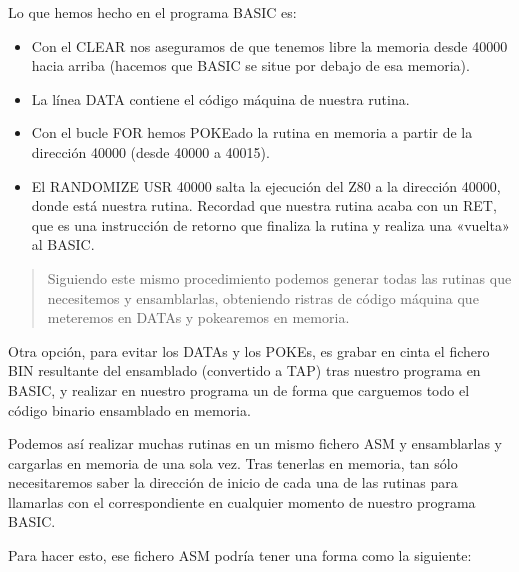 \documentclass[letterpaper,10pt,spanish]{sphinxmanual}
\begin{document}
Lo que hemos hecho en el programa BASIC es:
\begin{itemize}
\item {} 
Con el CLEAR nos aseguramos de que tenemos libre la memoria desde 40000 hacia arriba (hacemos que BASIC se situe por debajo de esa memoria).

\item {} 
La línea DATA contiene el código máquina de nuestra rutina.

\item {} 
Con el bucle FOR hemos POKEado la rutina en memoria a partir de la dirección 40000 (desde 40000 a 40015).

\item {} 
El RANDOMIZE USR 40000 salta la ejecución del Z80 a la dirección 40000, donde está nuestra rutina. Recordad que nuestra rutina acaba con un RET, que es una instrucción de retorno que finaliza la rutina y realiza una «vuelta» al BASIC.

\end{itemize}
\begin{quote}

Siguiendo este mismo procedimiento podemos generar todas las rutinas que necesitemos y ensamblarlas, obteniendo ristras de código máquina que meteremos en DATAs y pokearemos en memoria.
\end{quote}

Otra opción, para evitar los DATAs y los POKEs, es grabar en cinta el fichero BIN resultante del ensamblado (convertido a TAP) tras nuestro programa en BASIC, y realizar en nuestro programa un  de forma que carguemos todo el código binario ensamblado en memoria.

Podemos así realizar muchas rutinas en un mismo fichero ASM y ensamblarlas y cargarlas en memoria de una sola vez. Tras tenerlas en memoria, tan sólo necesitaremos saber la dirección de inicio de cada una de las rutinas para llamarlas con el  correspondiente en cualquier momento de nuestro programa BASIC.

Para hacer esto, ese fichero ASM podría tener una forma como la siguiente:

\begin{sphinxVerbatim}[commandchars=\\\{\}]
 

 
\end{sphinxVerbatim}
\end{document}
